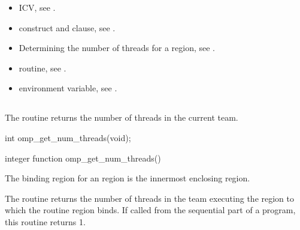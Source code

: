 \crossreferences
\begin{itemize}
\item {} ICV, see 
.

\item {} construct and  clause, see 
.

\item Determining the number of threads for a  region, see
. 

\item {} routine, see 
.

\item {} environment variable, see 
.
\end{itemize}









\subsection{}
\label{subsec:omp_get_num_threads}
\summary
The  routine returns the number of threads in the current 
team.
\format
\ccppspecificstart
\begin{boxedcode}
int omp\_get\_num\_threads(void); 
\end{boxedcode}
\ccppspecificend

\fortranspecificstart
\begin{boxedcode}
integer function omp\_get\_num\_threads()
\end{boxedcode}
\fortranspecificend

\binding
The binding region for an  region is the innermost enclosing 
 region.

\effect
The  routine returns the number of threads in the team 
executing the  region to which the routine region binds. If called from the 
sequential part of a program, this routine returns 1. 

